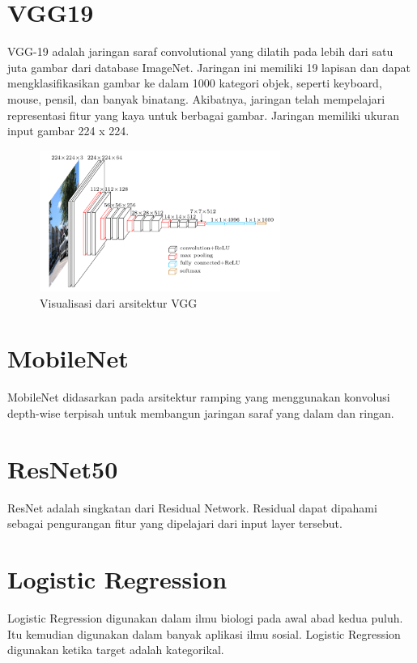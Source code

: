 \section{VGG19}
\par VGG-19 adalah jaringan saraf convolutional yang dilatih pada lebih dari satu juta gambar dari database ImageNet. Jaringan ini memiliki 19 lapisan dan dapat mengklasifikasikan gambar ke dalam 1000 kategori objek, seperti keyboard, mouse, pensil, dan banyak binatang. Akibatnya, jaringan telah mempelajari representasi fitur yang kaya untuk berbagai gambar. Jaringan memiliki ukuran input gambar 224 x 224\cite{vgg19_def}.
\begin{figure}[!ht]
	\centering\includegraphics[width=0.7\textwidth]{bab2/figures/figure-vgg.png}
	\caption{Visualisasi dari arsitektur VGG\cite{figure_vgg}}
	\label{fig:abstraksi1}
\end{figure}

\section{MobileNet}
\par MobileNet didasarkan pada arsitektur ramping yang menggunakan konvolusi depth-wise terpisah untuk membangun jaringan saraf yang dalam dan ringan\cite{mobilenet_def}. 

\section{ResNet50}
\par ResNet adalah singkatan dari Residual Network. Residual dapat dipahami sebagai pengurangan fitur yang dipelajari dari input layer tersebut\cite{resnet_def}.

\section{Logistic Regression}
\par Logistic Regression digunakan dalam ilmu biologi pada awal abad kedua puluh. Itu kemudian digunakan dalam banyak aplikasi ilmu sosial. Logistic Regression digunakan ketika target adalah kategorikal.

